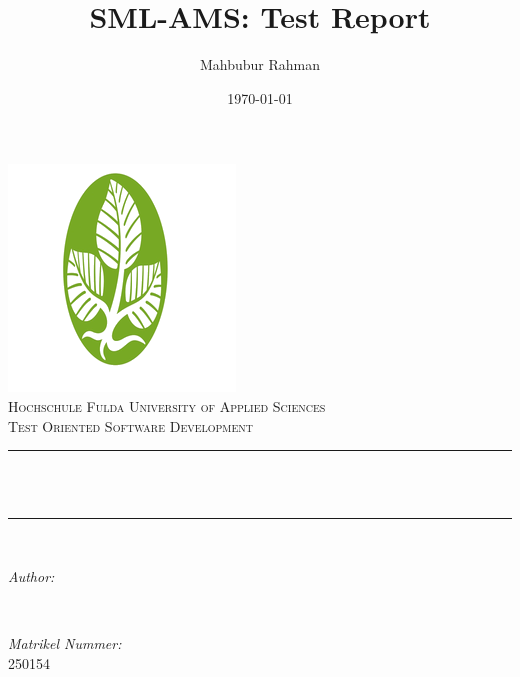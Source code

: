 \documentclass[12pt]{article}
\title{SML-AMS: Test Report}								%
\author{Mahbubur Rahman}								%
\date{\today}											%
\makeatletter
\let\thetitle\@title
\let\theauthor\@author
\let\thedate\@date
\def\thematrikel{250154}
\makeatother
\begin{document}

\begin{titlepage}
	\centering
    \vspace*{0.5 cm}
    \includegraphics[scale = 0.75]{HS-Fulda.png}\\[1.0 cm]	%
    \textsc{\LARGE Hochschule Fulda University of Applied Sciences}\\[2.0 cm]	%
	\textsc{\large Test Oriented Software Development}\\[0.5 cm]				%
	\rule{\linewidth}{0.2 mm} \\[0.4 cm]
	{ \huge \bfseries \thetitle}\\
	\rule{\linewidth}{0.2 mm} \\[1.5 cm]
	
	\begin{minipage}{0.4\textwidth}
		\begin{flushleft} \large
			\emph{Author:}\\
			\theauthor
			\end{flushleft}
			\end{minipage}~
			\begin{minipage}{0.4\textwidth}
			\begin{flushright} \large
			\emph{Matrikel Nummer:} \\
			\thematrikel									%
		\end{flushright}
	\end{minipage}\\[2 cm]
	
	{\large \thedate}\\[2 cm]
 
	\vfill
	
\end{titlepage}

\end{document}
